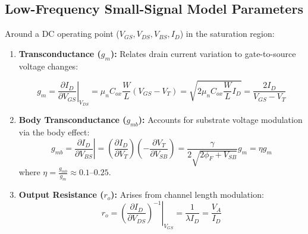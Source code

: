 \documentclass[12pt,a4paper]{article}
\begin{document}
\subsection{Low-Frequency Small-Signal Model Parameters}
Around a DC operating point ($V_{GS}, V_{DS}, V_{BS}, I_D$) in the saturation region:

\begin{enumerate}[label=\arabic*., leftmargin=*]
  \item \textbf{Transconductance ($g_m$):} Relates drain current variation to gate-to-source voltage changes:
  \begin{tcolorbox}[formulabox, title={\textbf{Three Equivalent Formulas for Transconductance $g_m$}}]
  \begin{equation}
    g_m = \left.\frac{\partial I_D}{\partial V_{GS}}\right|_{V_{DS}} = \mu_n C_{ox} \frac{W}{L} (V_{GS} - V_T) = \sqrt{2 \mu_n C_{ox} \frac{W}{L} I_D} = \frac{2 I_D}{V_{GS} - V_T}
  \end{equation}
  \end{tcolorbox}

  \item \textbf{Body Transconductance ($g_{mb}$):} Accounts for substrate voltage modulation via the body effect:
  \begin{equation}
    g_{mb} = \left.\frac{\partial I_D}{\partial V_{BS}}\right| = \left(\frac{\partial I_D}{\partial V_T}\right) \left(-\frac{\partial V_T}{\partial V_{SB}}\right) = \frac{\gamma}{2\sqrt{2\phi_F + V_{SB}}} g_m = \eta g_m
  \end{equation}
  where $\eta = \frac{g_{mb}}{g_m} \approx 0.1\text{--}0.25$.

  \item \textbf{Output Resistance ($r_o$):} Arises from channel length modulation:
  \begin{equation}
    r_o = \left.\left(\frac{\partial I_D}{\partial V_{DS}}\right)^{-1}\right|_{V_{GS}} = \frac{1}{\lambda I_D} = \frac{V_A}{I_D}
  \end{equation}
\end{enumerate}
\end{document}
